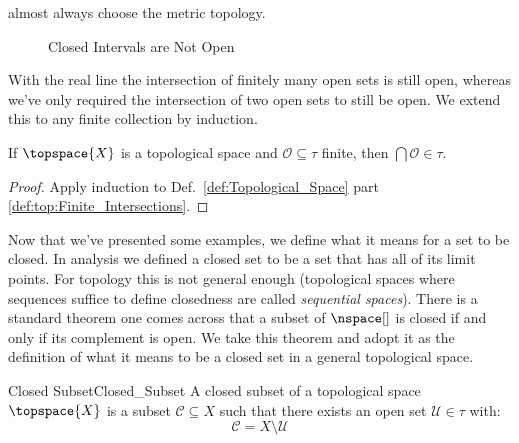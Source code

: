 \documentclass[oneside]{book}                                                  %
\begin{document}
                almost always choose the metric topology.
                \begin{figure}[H]
                    \centering
                    \captionsetup{type=figure}
                    
                    \caption{Closed Intervals are Not Open}
                    \label{fig:Closed_Interval_Not_Open}
                \end{figure}
                With the real line the intersection of finitely many open sets
                is still open, whereas we've only required the intersection of
                two open sets to still be open. We extend this to any finite
                collection by induction.
                \begin{theorem}
                    \label{thm:Finite_Intersections_Is_Open}%
                    If $\topspace{X}$ is a topological space and
                    $\mathcal{O}\subseteq\tau$ finite, then
                    $\bigcap\mathcal{O}\in\tau$.
                \end{theorem}
                \begin{proof}
                    Apply induction to Def.~\ref{def:Topological_Space}
                    part \ref{def:top:Finite_Intersections}.
                \end{proof}
                Now that we've presented some examples, we define what it means
                for a set to be closed. In analysis we defined a closed set to
                be a set that has all of its limit points. For topology this is
                not general enough (topological spaces where sequences suffice
                to define closedness are called \textit{sequential spaces}).
                There is a standard theorem one comes across that a subset of
                $\nspace[]$ is closed if and only if its complement is open. We
                take this theorem and adopt it as the definition of what it
                means to be a closed set in a general topological space.
                \begin{fdefinition}{Closed Subset}{Closed_Subset}
                    A closed subset of a topological space $\topspace{X}$ is a
                    subset $\mathcal{C}\subseteq{X}$ such that there exists an
                    open set $\mathcal{U}\in\tau$ with:
                    \begin{equation*}
                        \mathcal{C}=X\setminus\mathcal{U}
                    \end{equation*}
                \end{fdefinition}
\end{document}
